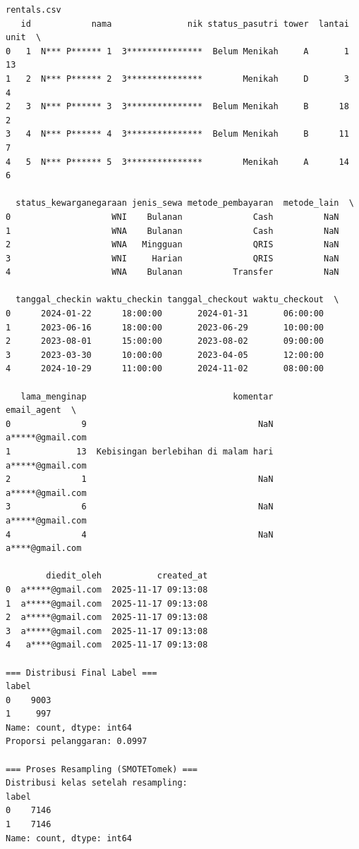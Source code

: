 \begin{lstlisting}[caption={Output 5}]
rentals.csv
   id            nama               nik status_pasutri tower  lantai  unit  \
0   1  N*** P****** 1  3***************  Belum Menikah     A       1    13   
1   2  N*** P****** 2  3***************        Menikah     D       3     4   
2   3  N*** P****** 3  3***************  Belum Menikah     B      18     2   
3   4  N*** P****** 4  3***************  Belum Menikah     B      11     7   
4   5  N*** P****** 5  3***************        Menikah     A      14     6   

  status_kewarganegaraan jenis_sewa metode_pembayaran  metode_lain  \
0                    WNI    Bulanan              Cash          NaN   
1                    WNA    Bulanan              Cash          NaN   
2                    WNA   Mingguan              QRIS          NaN   
3                    WNI     Harian              QRIS          NaN   
4                    WNA    Bulanan          Transfer          NaN   

  tanggal_checkin waktu_checkin tanggal_checkout waktu_checkout  \
0      2024-01-22      18:00:00       2024-01-31       06:00:00   
1      2023-06-16      18:00:00       2023-06-29       10:00:00   
2      2023-08-01      15:00:00       2023-08-02       09:00:00   
3      2023-03-30      10:00:00       2023-04-05       12:00:00   
4      2024-10-29      11:00:00       2024-11-02       08:00:00   

   lama_menginap                             komentar       email_agent  \
0              9                                  NaN  a*****@gmail.com   
1             13  Kebisingan berlebihan di malam hari  a*****@gmail.com   
2              1                                  NaN  a*****@gmail.com   
3              6                                  NaN  a*****@gmail.com   
4              4                                  NaN   a****@gmail.com   

        diedit_oleh           created_at  
0  a*****@gmail.com  2025-11-17 09:13:08  
1  a*****@gmail.com  2025-11-17 09:13:08  
2  a*****@gmail.com  2025-11-17 09:13:08  
3  a*****@gmail.com  2025-11-17 09:13:08  
4   a****@gmail.com  2025-11-17 09:13:08  

=== Distribusi Final Label ===
label
0    9003
1     997
Name: count, dtype: int64
Proporsi pelanggaran: 0.0997

=== Proses Resampling (SMOTETomek) ===
Distribusi kelas setelah resampling: 
label
0    7146
1    7146
Name: count, dtype: int64


\end{lstlisting}
